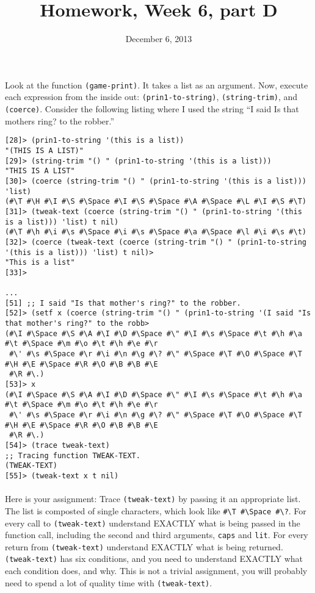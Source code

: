 \documentclass{article}
\title{Homework, Week 6, part D}
\date{December 6, 2013}
\begin{document}
\maketitle{}

\paragraph{}Look at the function \texttt{(game-print)}. It takes a list as an argument. Now, execute each expression from the inside out:  \texttt{(prin1-to-string)}, \texttt{(string-trim)}, and \texttt{(coerce)}. Consider the following listing where I used the string ``I said \textquotesingle\textquotesingle{}Is that mother\textquotesingle{}s ring?\textquotesingle\textquotesingle{} to the robber.''

\lstset{language=Lisp,numbers=left,keepspaces=false,basicstyle=\small,numberstyle=\tiny,breaklines=true,showstringspaces=false}
\begin{lstlisting}
[28]> (prin1-to-string '(this is a list))
"(THIS IS A LIST)"
[29]> (string-trim "() " (prin1-to-string '(this is a list)))
"THIS IS A LIST"
[30]> (coerce (string-trim "() " (prin1-to-string '(this is a list))) 'list)
(#\T #\H #\I #\S #\Space #\I #\S #\Space #\A #\Space #\L #\I #\S #\T)
[31]> (tweak-text (coerce (string-trim "() " (prin1-to-string '(this is a list))) 'list) t nil)
(#\T #\h #\i #\s #\Space #\i #\s #\Space #\a #\Space #\l #\i #\s #\t)
[32]> (coerce (tweak-text (coerce (string-trim "() " (prin1-to-string '(this is a list))) 'list) t nil)>
"This is a list"
[33]>

...
[51] ;; I said "Is that mother's ring?" to the robber.
[52]> (setf x (coerce (string-trim "() " (prin1-to-string '(I said "Is that mother's ring?" to the robb>
(#\I #\Space #\S #\A #\I #\D #\Space #\" #\I #\s #\Space #\t #\h #\a #\t #\Space #\m #\o #\t #\h #\e #\r
 #\' #\s #\Space #\r #\i #\n #\g #\? #\" #\Space #\T #\O #\Space #\T #\H #\E #\Space #\R #\O #\B #\B #\E
 #\R #\.)
[53]> x
(#\I #\Space #\S #\A #\I #\D #\Space #\" #\I #\s #\Space #\t #\h #\a #\t #\Space #\m #\o #\t #\h #\e #\r
 #\' #\s #\Space #\r #\i #\n #\g #\? #\" #\Space #\T #\O #\Space #\T #\H #\E #\Space #\R #\O #\B #\B #\E
 #\R #\.)
[54]> (trace tweak-text)
;; Tracing function TWEAK-TEXT.
(TWEAK-TEXT)
[55]> (tweak-text x t nil)
\end{lstlisting}

\paragraph{}Here is your assignment: Trace \texttt{(tweak-text)} by passing it an appropriate list. The list is composted of single characters, which look like \texttt{\#\textbackslash{}T \#\textbackslash{}Space \#\textbackslash{}?}. For every call to \texttt{(tweak-text)} understand EXACTLY what is being passed in the function call, including the second and third arguments, \texttt{caps} and \texttt{lit}. For every return from \texttt{(tweak-text)} understand EXACTLY what is being returned. \texttt{(tweak-text)} has six conditions, and you need to understand EXACTLY what each condition does, and why. This is not a trivial assignment, you will probably need to spend a lot of quality time with \texttt{(tweak-text)}.
\end{document}
